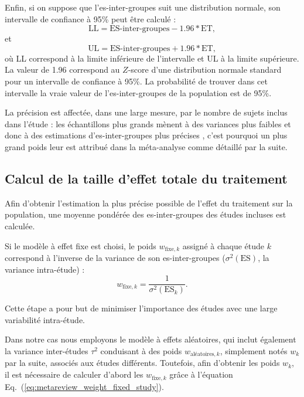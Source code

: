 Enfin, si on suppose que l'\gls{es}-inter-groupes suit une distribution normale, son intervalle de confiance à 95\% peut être calculé \citep[Chapitre~8]{Borenstein2009} :
\begin{equation}
\label{eq:metareview_es_between_confidence_interval_95_lower_bound}
\text{LL} = \text{ES-inter-groupes} - 1.96 * \text{ET},
\end{equation}
et 
\begin{equation}
\label{eq:metareview_es_between_confidence_interval_95_upper_bound}
\text{UL} = \text{ES-inter-groupes} + 1.96 * \text{ET},
\end{equation}
où LL correspond à la limite inférieure de l'intervalle et UL à la limite supérieure. La valeur de 1.96 correspond au $Z$-score d'une distribution 
normale standard pour un intervalle de confiance à 95\%. La probabilité de trouver dans cet intervalle
la vraie valeur de l'\gls{es}-inter-groupes de la population est de 95\%.

La précision est affectée, dans une large mesure, par le nombre de sujets inclus dans l'étude : les échantillons plus grands mènent à des
variances plus faibles et donc à des estimations d'\gls{es}-inter-groupes plus précises \citep[Chapitre~8]{Borenstein2009}, c'est pourquoi un plus grand 
poids leur est attribué dans la méta-analyse comme détaillé par la suite.

\subsection{Calcul de la taille d'effet totale du traitement} \label{compute_summary_effect}

Afin d'obtenir l'estimation la plus précise possible de l'effet du traitement sur la population, une moyenne pondérée des \gls{es}-inter-groupes 
des études incluses est calculée.

Si le modèle à effet fixe est choisi, le poids $w_{\text{fixe},k}$ assigné à chaque étude $k$ correspond à l'inverse de la variance de son 
\gls{es}-inter-groupes ($\sigma^2(\text{ES})$, la variance intra-étude) \citep[Chapitre~12]{Borenstein2009} :
\begin{equation}
\label{eq:metareview_weight_fixed_study}
w_{\text{fixe},k} = \frac{1}{\sigma^2(\text{ES}_k)}.
\end{equation} 

Cette étape a pour but de minimiser l'importance des études avec une large variabilité intra-étude.

Dans notre cas nous employons le modèle à effets aléatoires, qui inclut également la variance inter-études $\tau^2$ conduisant à des 
poids $w_{\text{aléatoires},k}$, simplement notés $w_k$ par la suite, associés aux études différents.
Toutefois, afin d'obtenir les poids $w_k$, il est nécessaire de calculer d'abord les $w_{\text{fixe},k}$ grâce à l'équation 
Eq.~(\ref{eq:metareview_weight_fixed_study}).

